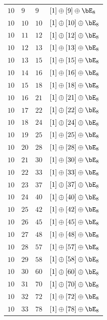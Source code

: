 \begin{center}
\begin{longtable}{llll}
 \(10\) & \(9\) & \(9\) & \([1] \oplus [9] \oplus \bE_{8}\) \\
 \(10\) & \(10\) & \(10\) & \([1] \oplus [10] \oplus \bE_{8}\) \\
 \(10\) & \(11\) & \(12\) & \([1] \oplus [12] \oplus \bE_{8}\) \\
 \(10\) & \(12\) & \(13\) & \([1] \oplus [13] \oplus \bE_{8}\) \\
 \(10\) & \(13\) & \(15\) & \([1] \oplus [15] \oplus \bE_{8}\) \\
 \(10\) & \(14\) & \(16\) & \([1] \oplus [16] \oplus \bE_{8}\) \\
 \(10\) & \(15\) & \(18\) & \([1] \oplus [18] \oplus \bE_{8}\) \\
 \(10\) & \(16\) & \(21\) & \([1] \oplus [21] \oplus \bE_{8}\) \\
 \(10\) & \(17\) & \(22\) & \([1] \oplus [22] \oplus \bE_{8}\) \\
 \(10\) & \(18\) & \(24\) & \([1] \oplus [24] \oplus \bE_{8}\) \\
 \(10\) & \(19\) & \(25\) & \([1] \oplus [25] \oplus \bE_{8}\) \\
 \(10\) & \(20\) & \(28\) & \([1] \oplus [28] \oplus \bE_{8}\) \\
 \(10\) & \(21\) & \(30\) & \([1] \oplus [30] \oplus \bE_{8}\) \\
 \(10\) & \(22\) & \(33\) & \([1] \oplus [33] \oplus \bE_{8}\) \\
 \(10\) & \(23\) & \(37\) & \([1] \oplus [37] \oplus \bE_{8}\) \\
 \(10\) & \(24\) & \(40\) & \([1] \oplus [40] \oplus \bE_{8}\) \\
 \(10\) & \(25\) & \(42\) & \([1] \oplus [42] \oplus \bE_{8}\) \\
 \(10\) & \(26\) & \(45\) & \([1] \oplus [45] \oplus \bE_{8}\) \\
 \(10\) & \(27\) & \(48\) & \([1] \oplus [48] \oplus \bE_{8}\) \\
 \(10\) & \(28\) & \(57\) & \([1] \oplus [57] \oplus \bE_{8}\) \\
 \(10\) & \(29\) & \(58\) & \([1] \oplus [58] \oplus \bE_{8}\) \\
 \(10\) & \(30\) & \(60\) & \([1] \oplus [60] \oplus \bE_{8}\) \\
 \(10\) & \(31\) & \(70\) & \([1] \oplus [70] \oplus \bE_{8}\) \\
 \(10\) & \(32\) & \(72\) & \([1] \oplus [72] \oplus \bE_{8}\) \\
 \(10\) & \(33\) & \(78\) & \([1] \oplus [78] \oplus \bE_{8}\) \\

\end{longtable}
\end{center}

